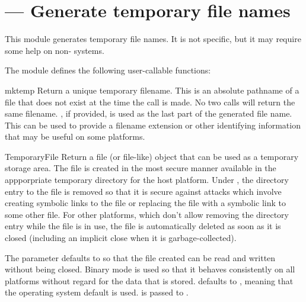 \section{ ---
         Generate temporary file names}




This module generates temporary file names.  It is not \UNIX{} specific,
but it may require some help on non-\UNIX{} systems.

The module defines the following user-callable functions:

\begin{funcdesc}{mktemp}{}
Return a unique temporary filename.  This is an absolute pathname of a
file that does not exist at the time the call is made.  No two calls
will return the same filename.  , if provided, is used as
the last part of the generated file name.  This can be used to provide
a filename extension or other identifying information that may be
useful on some platforms.
\end{funcdesc}

\begin{funcdesc}{TemporaryFile}{}
Return a file (or file-like) object that can be used as a temporary
storage area.  The file is created in the most secure manner available
in the appporpriate temporary directory for the host platform.  Under
\UNIX, the directory entry to the file is removed so that it is secure
against attacks which involve creating symbolic links to the file or
replacing the file with a symbolic link to some other file.  For other
platforms, which don't allow removing the directory entry while the
file is in use, the file is automatically deleted as soon as it is
closed (including an implicit close when it is garbage-collected).

The  parameter defaults to  so that the file
created can be read and written without being closed.  Binary mode is
used so that it behaves consistently on all platforms without regard
for the data that is stored.   defaults to ,
meaning that the operating system default is used.   is
passed to .
\end{funcdesc}

